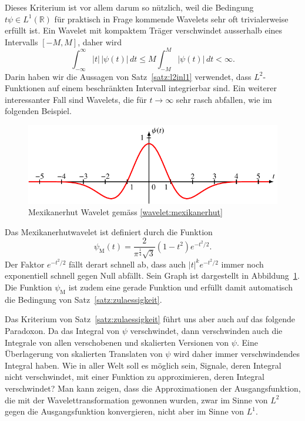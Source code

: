 Dieses Kriterium ist vor allem darum so nützlich, weil die Bedingung
$t\psi\in L^1(\mathbb R)$ für praktisch in Frage kommende Wavelets sehr
oft trivialerweise erfüllt ist.
Ein Wavelet mit kompaktem Träger verschwindet ausserhalb eines Intervalls
$[-M,M]$, daher wird 
\[
\int_{-\infty}^\infty |t|\,|\psi(t)|\,dt
\le 
M \int_{-M}^M |\psi(t)|\,dt < \infty.
\]
Darin haben wir die Aussagen von Satz~\ref{satz:l2inl1} verwendet,
dass $L^2$-Funktionen auf einem beschränkten Intervall integrierbar sind.
Ein weiterer interessanter Fall sind Wavelets, die für $t\to\infty$
sehr rasch abfallen, wie im folgenden Beispiel.

\begin{beispiel}
\begin{figure}
\centering
\includegraphics{chapters/4-cwt/images/mexican.pdf}
\caption{Mexikanerhut Wavelet gemäss
\eqref{wavelet:mexikanerhut}
\label{wavelet:mexikanerhut:graph}}
\end{figure}
Das Mexikanerhutwavelet ist definiert durch die Funktion
\begin{equation}
\psi_{\text{M}}(t) = \frac{2}{\pi^{\frac14}\sqrt{3}}(1-t^2) e^{-t^2/2}.
\label{wavelet:mexikanerhut}
\end{equation}
Der Faktor $e^{-t^2/2}$ fällt derart schnell ab, dass auch $|t|^k e^{-t^2/2}$
immer noch exponentiell schnell gegen Null abfällt.
Sein Graph ist dargestellt in Abbildung~\ref{wavelet:mexikanerhut:graph}.
Die Funktion $\psi_{\text{M}}$ ist zudem eine gerade Funktion und %
erfüllt damit automatisch die Bedingung von Satz~\ref{satz:zulaessigkeit}.
\end{beispiel}

Das Kriterium von Satz~\ref{satz:zulaessigkeit} führt uns aber auch auf
das folgende Paradoxon. 
Da das Integral von $\psi$ verschwindet, dann verschwinden auch die Integrale
von allen verschobenen und skalierten Versionen von $\psi$.
Eine Überlagerung von skalierten Translaten von $\psi$ wird daher
immer verschwindendes Integral haben.
Wie in aller Welt soll es möglich sein, Signale, deren Integral nicht 
verschwindet, mit einer Funktion zu approximieren, deren Integral
verschwindet?
Man kann zeigen, dass die Approximationen der Ausgangsfunktion,
die mit der Wavelettransformation gewonnen wurden, zwar im Sinne von $L^2$
gegen die Ausgangsfunktion konvergieren, nicht aber im Sinne von $L^1$.



